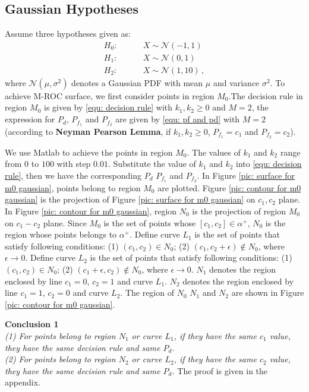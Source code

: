 \documentclass[12pt,journal,a4paper,twoside,onecolumn,draft]{IEEEtran}
\begin{document}
\begin{spacing}{2.5}
\subsection{Gaussian Hypotheses}
Assume three hypotheses given as:
\begin{equation}
\label{equ: Gaussian Hypothesis}
\begin{split}
	H_0:\;\;\;\;\;\;\;\;&X \sim \mathcal{N}(-1,1)\\
    H_1:\;\;\;\;\;\;\;\;&X \sim \mathcal{N}(0,1)\\
    H_2:\;\;\;\;\;\;\;\;&X \sim \mathcal{N}(1,10)\,,
\end{split}
\end{equation}
where $\mathcal{N}(\mu,\sigma^2)$ denotes a Gaussian PDF with mean $\mu$ and variance $\sigma^2$.
To achieve M-ROC surface, we first consider points in region $M_0$.The decision rule in region $M_0$ is given by \eqref{equ: decision rule}
with $k_1, k_2 \geq 0$ and $M = 2$, the expression for $P_d$, $P_{f_1}$ and $P_{f_2}$ are given by \eqref{equ: pf and pd} with $M = 2$ (according to \textbf{Neyman Pearson Lemma}, if $k_1, k_2 \geq 0$, $P_{f_1} = c_1$ and $P_{f_2} = c_2$).

We use Matlab to achieve the points in region $M_0$. The values of $k_1$ and $k_2$ range from $0$ to $100$ with step $0.01$. Substitute the value of $k_1$ and $k_2$ into \eqref{equ: decision rule}, then we have the corresponding $P_d$ $P_{f_1}$ and $P_{f_2}$.  In Figure \ref{pic: surface for m0 gaussian}, points belong to region $M_0$ are plotted.
Figure \ref{pic: contour for m0 gaussian} is the projection of Figure \ref{pic: surface for m0 gaussian} on $c_1, c_2$ plane.
In Figure \ref{pic: contour for m0 gaussian}, region $N_0$ is the projection of region $M_0$ on $c_1 - c_2$ plane. Since $M_0$ is the set of points whose $[c_1, c_2] \in \alpha^+$, $N_0$ is the region whose points belongs to $\alpha^+$.
Define curve $L_1$ is the set of points that satisfy following conditions: (1) $(c_1, c_2) \in N_0$; (2) $(c_1, c_2+\epsilon) \notin N_0$, where $\epsilon \rightarrow 0$. Define curve $L_2$ is the set of points that satisfy following conditions: (1) $(c_1, c_2) \in N_0$; (2) $(c_1 + \epsilon, c_2) \notin N_0$, where $\epsilon \rightarrow 0$.
$N_1$ denotes the region enclosed by line $c_1 = 0$, $c_2 = 1$ and curve $L_1$.
$N_2$ denotes the region enclosed by line $c_1 = 1$, $c_2 = 0$ and curve $L_2$.
The region of $N_0$ $N_1$ and $N_2$ are shown in Figure \ref{pic: contour for m0 gaussian}.

\textbf{Conclusion 1}
\textit{\\(1) For points belong to region $N_1$ or curve $L_1$, if they have the same $c_1$ value, they have the same decision rule and same $P_d$.
\\(2) For points belong to region $N_2$ or curve $L_2$, if they have the same $c_2$ value, they have the same decision rule and same $P_d$.
}
The proof is given in the appendix.



\end{spacing}
\end{document}
